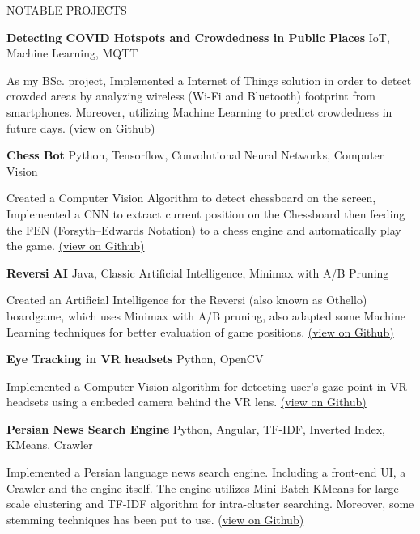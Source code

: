 \documentclass{resume} %
\begin{document}
\begin{rSection}{NOTABLE PROJECTS}
\vspace{-1.25em}


\item \textbf{Detecting COVID Hotspots and Crowdedness in Public Places} {IoT, Machine Learning, MQTT}
\begin{addmargin}[2em]{2em}
As my BSc. project, Implemented a Internet of Things solution in order to detect crowded areas by analyzing wireless (Wi-Fi and Bluetooth) footprint from smartphones. Moreover, utilizing Machine Learning to predict crowdedness in future days. \href{https://github.com/arminkz/crowdedness-detection}{(view on Github)}
\end{addmargin}


\item \textbf{Chess Bot} {Python, Tensorflow, Convolutional Neural Networks, Computer Vision}
\begin{addmargin}[2em]{2em}
Created a Computer Vision Algorithm to detect chessboard on the screen, Implemented a CNN to extract current position on the Chessboard then feeding the FEN (Forsyth–Edwards Notation) to a chess engine and automatically play the game. \href{https://github.com/arminkz/ChessBot}{(view on Github)}
\end{addmargin}


\item \textbf{Reversi AI}  {Java, Classic Artificial Intelligence, Minimax with A/B Pruning}
\begin{addmargin}[2em]{2em}
Created an Artificial Intelligence for the Reversi (also known as Othello) boardgame, which uses Minimax with A/B pruning, also adapted some Machine Learning techniques for better evaluation of game positions. \href{https://github.com/arminkz/Reversi}{(view on Github)}
\end{addmargin}

\item \textbf{Eye Tracking in VR headsets} {Python, OpenCV}
\begin{addmargin}[2em]{2em}
Implemented a Computer Vision algorithm for detecting user's gaze point in VR headsets using a embeded camera behind the VR lens. \href{https://github.com/arminkz/EyeTrackingVR}{(view on Github)}
\end{addmargin}


\item \textbf{Persian News Search Engine} {Python, Angular, TF-IDF, Inverted Index, KMeans, Crawler}
\begin{addmargin}[2em]{2em}
Implemented a Persian language news search engine. Including a front-end UI, a Crawler and the engine itself. The engine utilizes Mini-Batch-KMeans for large scale clustering and TF-IDF algorithm for intra-cluster searching. Moreover, some stemming techniques has been put to use.
\href{https://github.com/kianelbo/newsKAP}{(view on Github)}
\end{addmargin}


\end{rSection}
\end{document}
